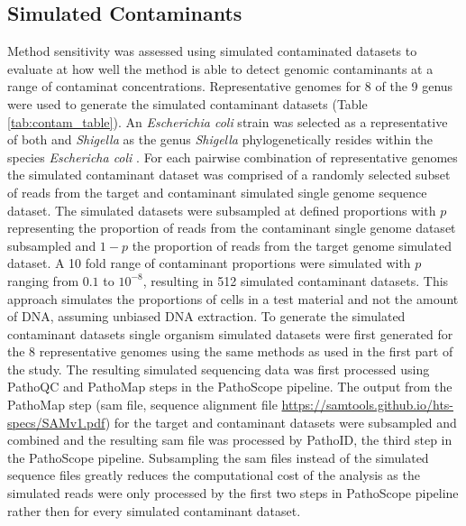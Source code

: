 \documentclass[fleqn,10pt,lineno]{wlpeerj}\usepackage[]{graphicx}\usepackage[]{color}
\begin{document}
\subsection*{Simulated Contaminants}
Method sensitivity was assessed using simulated contaminated datasets to evaluate at how well the method is able to detect genomic contaminants at a range of contaminat concentrations. 
Representative genomes for 8 of the 9 genus were used to generate the simulated contaminant datasets (Table \ref{tab:contam_table}). 
An \textit{Escherichia coli} strain was selected as a representative of both  and \textit{Shigella} as the genus \textit{Shigella} phylogenetically resides within the species \textit{Eschericha coli} \citep{lan2002escherichia}. 
For each pairwise combination of representative genomes the simulated contaminant dataset was comprised of a randomly selected subset of reads from the target and contaminant simulated single genome sequence dataset. 
The simulated datasets were subsampled at defined proportions with $p$ representing the proportion of reads from the contaminant single genome dataset subsampled and $1-p$ the proportion of reads from the target genome simulated dataset. 
A 10 fold range of contaminant proportions were simulated with $p$ ranging from $0.1$ to $10^{-8}$, resulting in 512 simulated contaminant datasets. 
This approach simulates the proportions of cells in a test material and not the amount of DNA, assuming unbiased DNA extraction. 
To generate the simulated contaminant datasets single organism simulated datasets were first generated for the 8 representative genomes using the same methods as used in the first part of the study. 
The resulting simulated sequencing data was first processed using PathoQC and PathoMap steps in the PathoScope pipeline. 
The output from the PathoMap step (sam file, sequence alignment file \url{https://samtools.github.io/hts-specs/SAMv1.pdf}) for the target and contaminant datasets were subsampled and combined and the resulting sam file was processed by PathoID, the third step in the PathoScope pipeline.
Subsampling the sam files instead of the simulated sequence files greatly reduces the computational cost of the analysis as the simulated reads were only processed by the first two steps in PathoScope pipeline rather then for every simulated contaminant dataset. 
\end{document}
